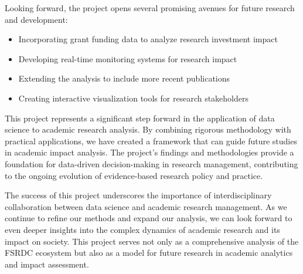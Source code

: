 \documentclass[12pt]{article}
\begin{document}
Looking forward, the project opens several promising avenues for future research and development:

\begin{itemize}
    \item Incorporating grant funding data to analyze research investment impact
    \item Developing real-time monitoring systems for research impact
    \item Extending the analysis to include more recent publications
    \item Creating interactive visualization tools for research stakeholders
\end{itemize}

This project represents a significant step forward in the application of data science to academic research analysis. By combining rigorous methodology with practical applications, we have created a framework that can guide future studies in academic impact analysis. The project's findings and methodologies provide a foundation for data-driven decision-making in research management, contributing to the ongoing evolution of evidence-based research policy and practice.

The success of this project underscores the importance of interdisciplinary collaboration between data science and academic research management. As we continue to refine our methods and expand our analysis, we can look forward to even deeper insights into the complex dynamics of academic research and its impact on society. This project serves not only as a comprehensive analysis of the FSRDC ecosystem but also as a model for future research in academic analytics and impact assessment.
\end{document}
